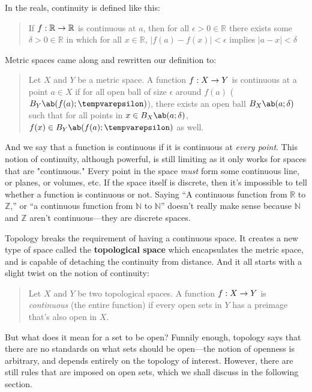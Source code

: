In the reals, continuity is defined like this:
\begin{quote}
  If \(f: \mathbb{R} \rightarrow \mathbb{R}\) is continuous at \(a\), then for all
  \(\epsilon > 0 \in \mathbb{R}\) there exists some \(\delta > 0 \in \mathbb{R}\) in
  which for all \(x \in \mathbb{R}\), \(|f(a) - f(x)| < \epsilon\) implies \(|a - x| < \delta\)
\end{quote}
Metric spaces came along and rewritten our definition to:
\begin{quote}
  Let \(X\) and \(Y\) be a metric space. A function \(f: X \rightarrow Y\) is continuous
  at a point \(a \in X\) if for all open ball of size \(\epsilon\) around \(f(a)\)
  (\(\oball{Y}{f(a)}{\epsilon}\)), there exists an open ball \(\oball{X}{a}{\delta}\) such that
  for all points in \(x \in \oball{X}{a}{\delta}\), \(f(x) \in \oball{Y}{f(a)}{\epsilon}\) as well.
\end{quote}
And we say that a function is continuous if it is continuous at \emph{every point}. This
notion of continuity, although powerful, is still limiting as it only works for spaces
that are "continuous." Every point in the space \emph{must} form some continuous line, or planes,
or volumes, etc. If the space itself is discrete, then it's impossible to tell whether a function
is continuous or not. Saying \enquote{A continuous function from \(\mathbb{R}\) to \(\mathbb{Z}\),}
or \enquote{a continuous function from \(\mathbb{N}\) to \(\mathbb{N}\)} doesn't really
make sense because \(\mathbb{N}\) and \(\mathbb{Z}\) aren't continuous---they are discrete spaces.

Topology breaks the requirement of having a continuous space. It creates a new type of space called
the \textbf{topological space} which encapsulates the metric space, and is capable of detaching
the continuity from distance. And it all starts with a slight twist on the notion of continuity:
\begin{quote}
  Let \(X\) and \(Y\) be two topological spaces. A function \(f: X \rightarrow Y\) is
  \emph{continuous} (the entire function) if every open sets in \(Y\) has a preimage
  that's also open in \(X\).  
\end{quote}
But what does it mean for a set to be open? Funnily enough, topology says that there
are no standards on what sets should be open---the notion of openness is arbitrary,
and depends entirely on the topology of interest. However, there are still rules that
are imposed on open sets, which we shall discuss in the following section.

